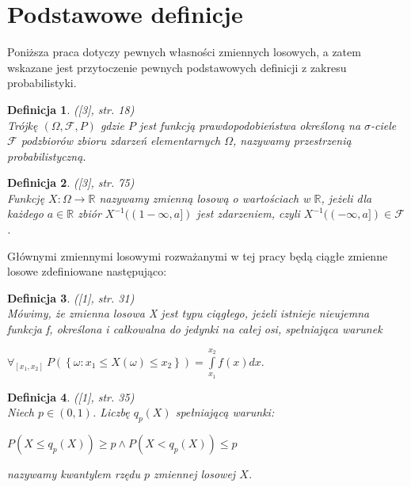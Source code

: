 \documentclass[12pt,a4paper,openany]{book}
\newtheorem{df}{Definicja}
\begin{document}
\section{Podstawowe definicje}

Poniższa praca dotyczy pewnych własności zmiennych losowych, a zatem wskazane jest przytoczenie pewnych podstawowych definicji z zakresu probabilistyki.

\begin{df} \textnormal{([3], str. 18)}\*\\
Trójkę $(\Omega,\mathcal{F},P)$ gdzie $P$ jest funkcją prawdopodobieństwa określoną na $\sigma$-ciele $\mathcal{F}$ podzbiorów zbioru zdarzeń elementarnych $\Omega$, nazywamy przestrzenią probabilistyczną.
\end{df}

\begin{df} \textnormal{([3], str. 75)}\*\\
Funkcję $X: \Omega \rightarrow \mathbb{R}$ nazywamy zmienną losową o wartościach w $\mathbb{R}$, jeżeli dla każdego $a \in \mathbb{R}$ zbiór $X^{-1}((1-\infty,a])$ jest zdarzeniem, czyli $X^{-1}((-\infty,a]) \in \mathcal{F}$.
\end{df}

Głównymi zmiennymi losowymi rozważanymi w tej pracy będą ciągłe zmienne losowe zdefiniowane następująco:

\begin{df} \textnormal{([1], str. 31)}\*\\
Mówimy, że zmienna losowa X jest typu ciągłego, jeżeli istnieje nieujemna funkcja f, określona i 
całkowalna do jedynki na całej osi, spełniająca warunek 
\begin{center}
$\forall_{[x_{1}, x_{2}]} \: P\left(\left\lbrace\omega: x_{1} \leqslant X(\omega) \leqslant x_{2}\right\rbrace\right) = \int\limits^{x_2}_{x_1} f(x)dx.$
\end{center}
\end{df}

\begin{df} \textnormal{([1], str. 35)}\*\\
Niech $p \in (0,1)$. Liczbę $q_{p}(X)$ spełniającą warunki:

\begin{center}
$P(X \leqslant q_{p}(X)) \geqslant p \wedge P(X < q_{p}(X)) \leqslant p$
\end{center}

nazywamy kwantylem rzędu $p$ zmiennej losowej $X$.
\end{df}
\end{document}
